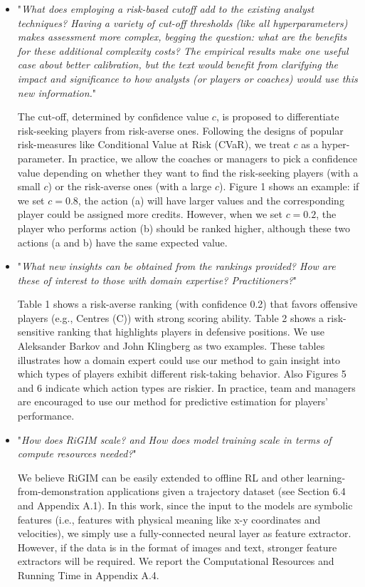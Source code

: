 \documentclass{article}
\begin{document}
\begin{itemize}
    \item "{\it What does employing a risk-based cutoff add to the existing analyst techniques? Having a variety of cut-off thresholds (like all hyperparameters) makes assessment more complex, begging the question: what are the benefits for these additional complexity costs? The empirical results make one useful case about better calibration, but the text would benefit from clarifying the impact and significance to how analysts (or players or coaches) would use this new information.}"
    
    The cut-off, determined by confidence value $c$, is proposed to differentiate risk-seeking players from risk-averse ones. Following the designs of popular risk-measures like Conditional Value at Risk (CVaR), we treat $c$ as a hyper-parameter.  In practice, we allow the coaches or managers to pick a confidence value depending on whether they want to find the risk-seeking players (with a small $c$) or the risk-averse ones (with a large $c$). Figure 1 shows an example: if we set $c=0.8$, the action (a) will have larger values and the corresponding player could be assigned more credits. However, when we set $c=0.2$, the player who performs action (b) should be ranked higher, although these two actions (a and b) have the same expected value.
    
    \item "{\it What new insights can be obtained from the rankings provided? How are these of interest to those with domain expertise? Practitioners?}"
    
    Table 1 shows a risk-averse ranking (with confidence 0.2) that favors offensive players (e.g., Centres (C)) with strong scoring ability. Table 2 shows a risk-sensitive ranking that highlights players in defensive positions. We use Aleksander Barkov and John Klingberg as two examples. These tables illustrates how a domain expert could use our method to gain insight into which types of players exhibit different risk-taking behavior. Also Figures 5 and 6 indicate which action types are riskier. In practice, team and managers are encouraged to use our method for predictive estimation for players' performance.   
    
    \item "{\it How does RiGIM scale? and How does model training scale in terms of compute resources needed?}"
    
    We believe RiGIM can be easily extended to offline RL and other learning-from-demonstration applications given a trajectory dataset (see Section 6.4 and Appendix A.1). In this work, since the input to the models are symbolic features (i.e., features with physical meaning like x-y coordinates and velocities), we simply use a fully-connected neural layer as feature extractor. However, if the data is in the format of images and text, stronger feature extractors will be required. We report the Computational Resources and Running Time in Appendix A.4.
    

\end{itemize}
\end{document}
